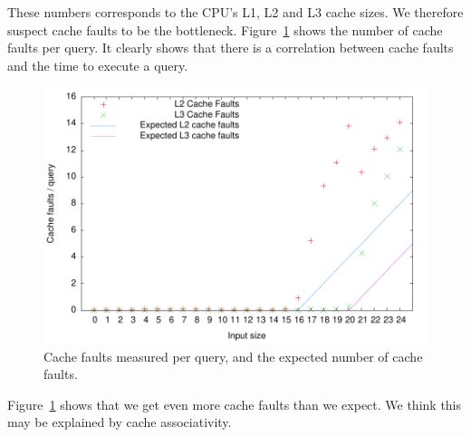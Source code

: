 These numbers corresponds to the CPU's L1, L2 and L3 cache sizes. We
therefore suspect cache faults to be the
bottleneck. Figure~\ref{fig:bs_cachefaults} shows the number of cache
faults per query. It clearly shows that there is a correlation between cache faults and the time to execute a query.

\begin{figure}[h!]
  \centering
  \includegraphics[width=\textwidth]{../week1/plots/outputs/bs_cachefaults}
  \caption{Cache faults measured per query, and the expected number of cache faults.}
  \label{fig:bs_cachefaults}
\end{figure}

Figure~\ref{fig:bs_cachefaults} shows that we get even more cache
faults than we expect. We think this may be explained by cache
associativity.

